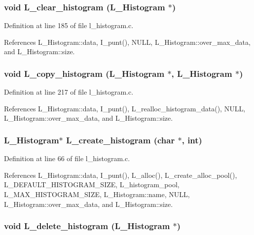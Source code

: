 \subsubsection{\setlength{\rightskip}{0pt plus 5cm}void L\_\-clear\_\-histogram (\bf{L\_\-Histogram} $\ast$)}\label{l__histogram_8h_62bf1bb8927be1244ae72d874f89f1a8}




Definition at line 185 of file l\_\-histogram.c.

References L\_\-Histogram::data, I\_\-punt(), NULL, L\_\-Histogram::over\_\-max\_\-data, and L\_\-Histogram::size.
\subsubsection{\setlength{\rightskip}{0pt plus 5cm}void L\_\-copy\_\-histogram (\bf{L\_\-Histogram} $\ast$, \bf{L\_\-Histogram} $\ast$)}\label{l__histogram_8h_766289a2c24b831d3d074fac1b2c7626}




Definition at line 217 of file l\_\-histogram.c.

References L\_\-Histogram::data, I\_\-punt(), L\_\-realloc\_\-histogram\_\-data(), NULL, L\_\-Histogram::over\_\-max\_\-data, and L\_\-Histogram::size.
\subsubsection{\setlength{\rightskip}{0pt plus 5cm}\bf{L\_\-Histogram}$\ast$ L\_\-create\_\-histogram (char $\ast$, int)}\label{l__histogram_8h_2d5c2c493e76b071960147fb669c03f9}




Definition at line 66 of file l\_\-histogram.c.

References L\_\-Histogram::data, I\_\-punt(), L\_\-alloc(), L\_\-create\_\-alloc\_\-pool(), L\_\-DEFAULT\_\-HISTOGRAM\_\-SIZE, L\_\-histogram\_\-pool, L\_\-MAX\_\-HISTOGRAM\_\-SIZE, L\_\-Histogram::name, NULL, L\_\-Histogram::over\_\-max\_\-data, and L\_\-Histogram::size.
\subsubsection{\setlength{\rightskip}{0pt plus 5cm}void L\_\-delete\_\-histogram (\bf{L\_\-Histogram} $\ast$)}\label{l__histogram_8h_97cba8f5f010d69017144c8e007c2353}




